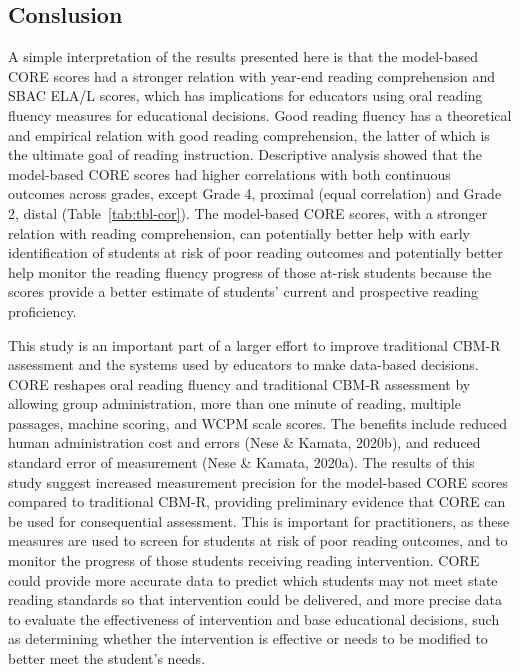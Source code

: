 \documentclass[
  english,
  man, fleqn, noextraspace]{apa6}
\begin{document}
\hypertarget{conslusion}{%
\subsection{Conslusion}\label{conslusion}}

A simple interpretation of the results presented here is that the model-based CORE scores had a stronger relation with year-end reading comprehension and SBAC ELA/L scores, which has implications for educators using oral reading fluency measures for educational decisions. Good reading fluency has a theoretical and empirical relation with good reading comprehension, the latter of which is the ultimate goal of reading instruction. Descriptive analysis showed that the model-based CORE scores had higher correlations with both continuous outcomes across grades, except Grade 4, proximal (equal correlation) and Grade 2, distal (Table~\ref{tab:tbl-cor}). The model-based CORE scores, with a stronger relation with reading comprehension, can potentially better help with early identification of students at risk of poor reading outcomes and potentially better help monitor the reading fluency progress of those at-risk students because the scores provide a better estimate of students' current and prospective reading proficiency.

This study is an important part of a larger effort to improve traditional CBM-R assessment and the systems used by educators to make data-based decisions. CORE reshapes oral reading fluency and traditional CBM-R assessment by allowing group administration, more than one minute of reading, multiple passages, machine scoring, and WCPM scale scores. The benefits include reduced human administration cost and errors (Nese \& Kamata, 2020b), and reduced standard error of measurement (Nese \& Kamata, 2020a). The results of this study suggest increased measurement precision for the model-based CORE scores compared to traditional CBM-R, providing preliminary evidence that CORE can be used for consequential assessment. This is important for practitioners, as these measures are used to screen for students at risk of poor reading outcomes, and to monitor the progress of those students receiving reading intervention. CORE could provide more accurate data to predict which students may not meet state reading standards so that intervention could be delivered, and more precise data to evaluate the effectiveness of intervention and base educational decisions, such as determining whether the intervention is effective or needs to be modified to better meet the student's needs.
\end{document}
